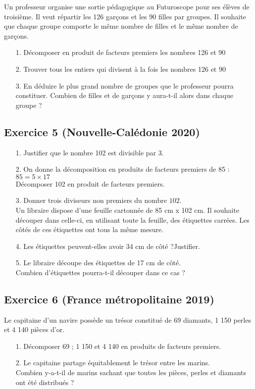 \documentclass[14 pt]{extarticle}
\theoremstyle{plain}
\begin{document}
 Un professeur organise une sortie pédagogique au Futuroscope pour ses élèves de troisième. Il veut répartir les 126 garçons et les 90 filles par groupes. Il souhaite que chaque groupe comporte le même nombre de filles et le même nombre de garçons.
 
 \begin{itemize}
 \item[1.] Décomposer en produit de facteurs premiers les nombres 126 et 90
 \item[2.] Trouver tous les entiers qui divisent à la fois les nombres 126 et 90
 \item[3.] En déduire le plus grand nombre de groupes que le professeur pourra
constituer. Combien de filles et de garçons y aura-t-il alors dans chaque groupe ?
 \end{itemize}


\subsection*{Exercice 5 (Nouvelle-Calédonie 2020)}

\begin{itemize}
\item[1.] Justifier que le nombre 102 est divisible par 3.
\item[2.] On donne la décomposition en produits de facteurs premiers de 85 : $85 = 5 \times 17$\\
Décomposer 102 en produit de facteurs premiers.
\item[3.] Donner trois diviseurs non premiers du nombre $102$.\\
Un libraire dispose d'une feuille cartonnée de 85 cm x 102 cm.
Il souhaite découper dans celle-ci, en utilisant toute la feuille, des étiquettes carrées. Les côtés de ces étiquettes ont tous la même mesure.
\item[4.] Les étiquettes peuvent-elles avoir 34 cm de côté ?Justifier.

\item[5.] Le libraire découpe des étiquettes de 17 cm de côté. \\
Combien d'étiquettes pourra-t-il découper dans ce cas ?
\end{itemize}


\subsection*{Exercice 6 (France métropolitaine 2019)}

Le capitaine d'un navire possède un trésor constitué de 69 diamants, 1 150 perles et 4 140 pièces d'or.

\begin{itemize}
\item[1.] Décomposer 69 ; 1 150 et 4 140 en produits de facteurs premiers.
\item[2.] Le capitaine partage équitablement le trésor entre les marins.\\
Combien y-a-t-il de marins sachant que toutes les pièces, perles et diamants ont été distribués ?
\end{itemize}
 	
\end{document}
